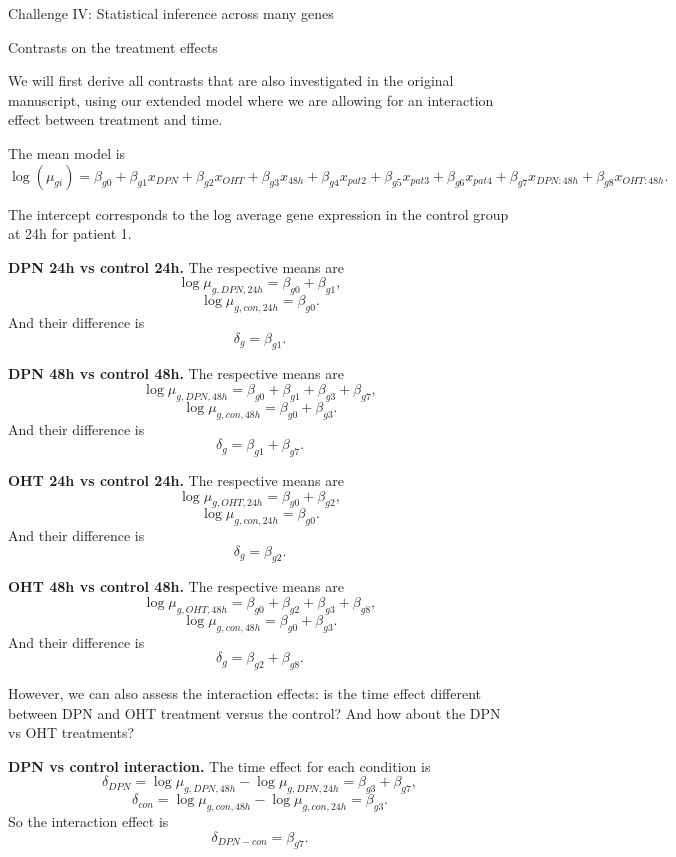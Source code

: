 \documentclass[ignorenonframetext,]{beamer}
\begin{document}
\begin{frame}[fragile]{Challenge IV: Statistical inference across many
genes}
\protect\hypertarget{challenge-iv-statistical-inference-across-many-genes}{}

\begin{block}{Contrasts on the treatment effects}

We will first derive all contrasts that are also investigated in the
original manuscript, using our extended model where we are allowing for
an interaction effect between treatment and time.

The mean model is
\[ \log(\mu_{gi}) = \beta_{g0} + \beta_{g1} x_{DPN} + \beta_{g2} x_{OHT} + \beta_{g3} x_{48h} + \beta_{g4} x_{pat2} + \beta_{g5} x_{pat3} + \beta_{g6} x_{pat4} + \beta_{g7} x_{DPN:48h} + \beta_{g8} x_{OHT:48h}. \]

The intercept corresponds to the log average gene expression in the
control group at 24h for patient 1.

\textbf{DPN 24h vs control 24h.} The respective means are
\[\log \mu_{g,DPN,24h} = \beta_{g0} + \beta_{g1},\]
\[\log \mu_{g,con,24h} = \beta_{g0}.\] And their difference is
\[ \delta_g = \beta_{g1}. \]

\textbf{DPN 48h vs control 48h.} The respective means are
\[\log \mu_{g,DPN,48h} = \beta_{g0} + \beta_{g1} + \beta_{g3} + \beta_{g7},\]
\[\log \mu_{g,con,48h} = \beta_{g0} + \beta_{g3}.\] And their difference
is \[ \delta_g = \beta_{g1} + \beta_{g7}. \]

\textbf{OHT 24h vs control 24h.} The respective means are
\[\log \mu_{g,OHT,24h} = \beta_{g0} + \beta_{g2} ,\]
\[\log \mu_{g,con,24h} = \beta_{g0}.\] And their difference is
\[ \delta_g = \beta_{g2}. \]

\textbf{OHT 48h vs control 48h.} The respective means are
\[\log \mu_{g,OHT,48h} = \beta_{g0} + \beta_{g2} + \beta_{g3} + \beta_{g8},\]
\[\log \mu_{g,con,48h} = \beta_{g0} + \beta_{g3}.\] And their difference
is \[ \delta_g = \beta_{g2} + \beta_{g8}. \]

However, we can also assess the interaction effects: is the time effect
different between DPN and OHT treatment versus the control? And how
about the DPN vs OHT treatments?

\textbf{DPN vs control interaction.} The time effect for each condition
is
\[ \delta_{DPN} = \log \mu_{g,DPN,48h} - \log \mu_{g,DPN,24h} = \beta_{g3} + \beta_{g7},\]
\[ \delta_{con} = \log \mu_{g,con,48h} - \log \mu_{g,con,24h} = \beta_{g3}. \]
So the interaction effect is \[\delta_{DPN-con} = \beta_{g7}.\]


\end{block}
\end{frame}
\end{document}
